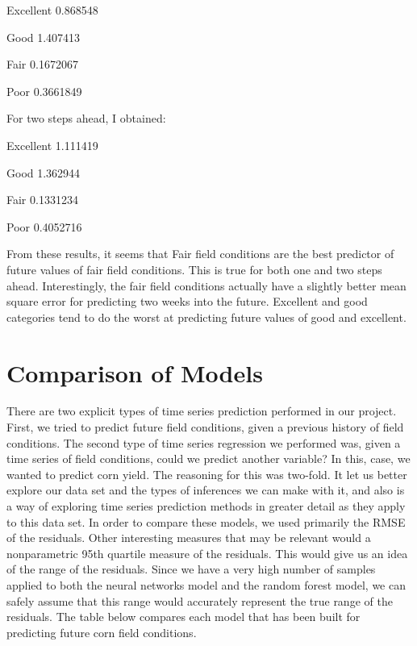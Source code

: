 \documentclass[a4paper]{apa6}
\begin{document}
Excellent    0.868548

Good	      1.407413

Fair 	      0.1672067

Poor	      0.3661849

For two steps ahead, I obtained:

Excellent    1.111419

Good	      1.362944

Fair	      0.1331234

Poor	      0.4052716

From these results, it seems that Fair field conditions are the best predictor of future values of fair field conditions. This is true for both one and two steps ahead. Interestingly, the fair field conditions actually have a slightly better mean square error for predicting two weeks into the future. Excellent and good categories tend to do the worst at predicting future values of good and excellent. 

\section*{Comparison of Models}
	
There are two explicit types of time series prediction performed in our project. First, we tried to predict future field conditions, given a previous history of field conditions. The second type of time series regression we performed was, given a time series of field conditions, could we predict another variable? In this, case, we wanted to predict corn yield. The reasoning for this was two-fold. It let us better explore our data set and the types of inferences we can make with it, and also is a way of exploring time series prediction methods in greater detail as they apply to this data set. In order to compare these models, we used primarily the RMSE of the residuals. Other interesting measures that may be relevant would a nonparametric 95th quartile measure of the residuals. This would give us an idea of the range of the residuals. Since we have a very high number of samples applied to both the neural networks model and the random forest model, we can safely assume that this range would accurately represent the true range of the residuals. The table below compares each model that has been built for predicting future corn field conditions. 
\end{document}
